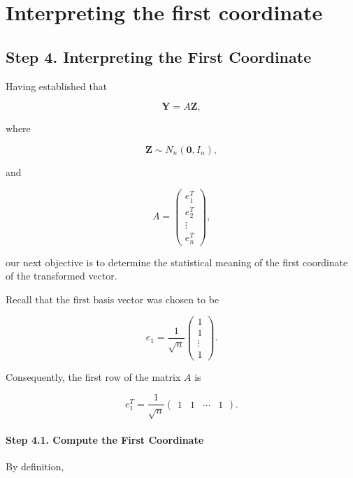 \documentclass[11pt]{article}
\begin{document}
	\section{Interpreting the first coordinate}
	\begin{mdframed}[
		linewidth=0.8pt,
		roundcorner=6pt,
		backgroundcolor=gray!5,
		linecolor=gray!60,
		innertopmargin=10pt,
		innerbottommargin=10pt,
		innerleftmargin=10pt,
		innerrightmargin=10pt
		]
		
		\subsection*{Step 4. Interpreting the First Coordinate}
		
		Having established that
		
		\[
		\mathbf Y=A\mathbf Z,
		\]
		
		where
		
		\[
		\mathbf Z\sim N_n(\mathbf0,I_n),
		\]
		
		and
		
		\[
		A=
		\begin{pmatrix}
			e_1^T\\
			e_2^T\\
			\vdots\\
			e_n^T
		\end{pmatrix},
		\]
		
		our next objective is to determine the statistical meaning of the first
		coordinate of the transformed vector.
		
		Recall that the first basis vector was chosen to be
		
		\[
		e_1
		=
		\frac1{\sqrt n}
		\begin{pmatrix}
			1\\
			1\\
			\vdots\\
			1
		\end{pmatrix}.
		\]
		
		Consequently, the first row of the matrix $A$ is
		
		\[
		e_1^T
		=
		\frac1{\sqrt n}
		\begin{pmatrix}
			1&1&\cdots&1
		\end{pmatrix}.
		\]
		
		\paragraph{Step 4.1. Compute the First Coordinate}
		
		By definition,
		

\end{mdframed}
\end{document}
